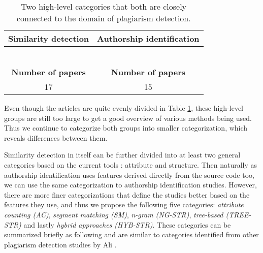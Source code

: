 \begin{table}[ht]
    \caption{Two high-level categories that both are closely connected to the domain of plagiarism detection.}
    \label{table-highcateq}
    \centering
    \begin{tabular}{ | c | c | }
        
        \hline
        {\bf Similarity detection} & {\bf Authorship identification} \\ \hline
    
        \cite{AFAPLI2015, LICD2010, AASCPD2012} & \cite{SCAANN2017, ABEC2014, CAPSCAP2014}   \\
        \cite{Heblikar2015NormalizationBS, USCR2014, AIR2015} &  \cite{SCANG2007, EJPFSAI2004, ACSBPD2012}\\
        \cite{OTIOLSS2015, BUAA2009, ramirez2015high} &  \cite{APASCAI2007, UCMHGAAI2007, ESHPFSCAC2008}\\
        \cite{Ohmann2015, TBCFPD2012, Fu2017WASTKAW} &  \cite{AIRTSCAA2009, TSUDIJSCAI2011, DNNSCAI2013} \\
        \cite{ASTMLPD2013, AAPSCDPTK2013, CPDPPD2013}    & \cite{SCAIUFL2013, SDNAIJSP2015, AISC2017} \\
        \cite{PACASCD2005, RCISCP2017} &  \\ \hline
        {\bf Number of papers} & {\bf Number of papers} \\ \hline
        17 & 15 \\ \hline
    \end{tabular}
\end{table}

\noindent
Even though the articles are quite evenly divided in Table \ref{table-highcateq}, these high-level groups are still too large to get a good overview of various methods being used. Thus we continue to categorize both groups into smaller categorization, which reveals differences between them.  

Similarity detection in itself can be further divided into at least two general categories based on the current tools \cite{RSCAD2016}: attribute and structure. Then naturally as authorship identification uses features derived directly from the source code too, we can use the same categorization to authorship identification studies. However, there are more finer categorizations that define the studies better based on the features they use, and thus we propose the following five categories: \emph{attribute counting (AC)}, \emph{segment matching (SM)}, \emph{n-gram (NG-STR)}, \emph{tree-based (TREE-STR)} and lastly \emph{hybrid approaches (HYB-STR)}. These categories can be summarized briefly as following and are similar to categories identified from other plagiarism detection studies by Ali \etal \cite{OCPOCP2011}. 

